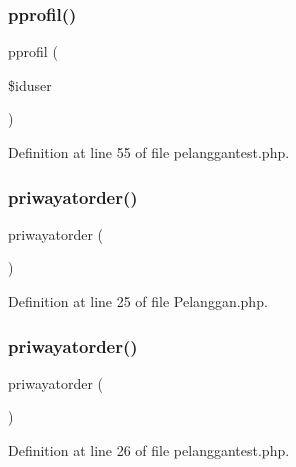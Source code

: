 \subsubsection{\texorpdfstring{pprofil()}{pprofil()}\hspace{0.1cm}{\footnotesize\ttfamily [2/2]}}
{\footnotesize\ttfamily pprofil (\begin{DoxyParamCaption}\item[{}]{\$iduser }\end{DoxyParamCaption})}



Definition at line 55 of file pelanggantest.\+php.

\mbox{\label{class_pelanggan_a64d2e90b64610aecd5143e436b3a1c00}} 
\subsubsection{\texorpdfstring{priwayatorder()}{priwayatorder()}\hspace{0.1cm}{\footnotesize\ttfamily [1/2]}}
{\footnotesize\ttfamily priwayatorder (\begin{DoxyParamCaption}{ }\end{DoxyParamCaption})}



Definition at line 25 of file Pelanggan.\+php.

\mbox{\label{class_pelanggan_a64d2e90b64610aecd5143e436b3a1c00}} 
\subsubsection{\texorpdfstring{priwayatorder()}{priwayatorder()}\hspace{0.1cm}{\footnotesize\ttfamily [2/2]}}
{\footnotesize\ttfamily priwayatorder (\begin{DoxyParamCaption}{ }\end{DoxyParamCaption})}



Definition at line 26 of file pelanggantest.\+php.

\mbox{\label{class_pelanggan_a580c41d234a611e73e56a65f5c5f3e48}} 
